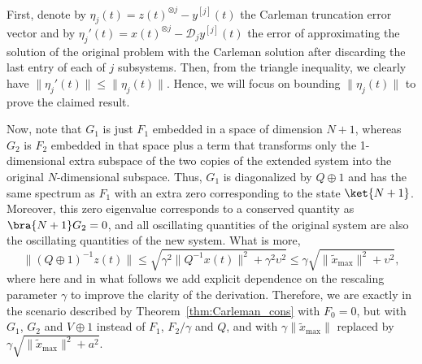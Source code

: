 \documentclass[superscriptaddress,onecolumn,nofootinbib,longbibliography,a4paper,accepted=2026-09-29]{quantumarticle}
\theoremstyle{plain}
\theoremstyle{definition}
\numberwithin{thm}{section}
\numberwithin{assumption}{section}
\numberwithin{lemma}{section}
\numberwithin{prop}{section}
\numberwithin{cor}{section}
\numberwithin{definition}{section}
\numberwithin{rmk}{section}
\numberwithin{equation}{section}
\newcommand{\ot}{\otimes}
\newcommand\D{ {\mathcal D} }
\begin{document}
First, denote by $\eta_j(t) = z(t)^{\ot j} - y^{[j]}(t)$ the Carleman truncation error vector and by $\eta_j'(t) = x(t)^{\ot j} - \D_j y^{[j]}(t) $ the error of approximating the solution of the original problem with the Carleman solution after discarding the last entry of each of $j$ subsystems. Then, from the triangle inequality, we clearly have $\|\eta_j'(t)\|\leq\|\eta_j(t)\|$. Hence, we will focus on bounding $\|\eta_j(t)\|$ to prove the claimed result.

Now, note that $G_1$ is just $F_1$ embedded in a space of dimension $N+1$, whereas $G_2$ is $F_2$ embedded in that space plus a term that transforms only the 1-dimensional extra subspace of the two copies of the extended system into the original $N$-dimensional subspace. Thus, $G_1$ is diagonalized by $Q\oplus 1$ and has the same spectrum as $F_1$ with an extra zero corresponding to the state $\ket{N+1}$. Moreover, this zero eigenvalue corresponds to a conserved quantity as $\bra{N+1}G_2=0$, and all oscillating quantities of the original system are also the oscillating quantities of the new system. What is more,
\begin{equation}
    \|(Q\oplus 1)^{-1} z(t)\| \leq \sqrt{\gamma^2\|Q^{-1} x(t)\|^2+\gamma^2 \upsilon^2} \leq \gamma \sqrt{\|\tilde{x}_{\mathrm{max}}\|^2+\upsilon^2},
\end{equation}
where here and in what follows we add explicit dependence on the rescaling parameter $\gamma$ to improve the clarity of the derivation. Therefore, we are exactly in the scenario described by Theorem~\ref{thm:Carleman_cons} with $F_0=0$, but with $G_1$, $G_2$ and $V\oplus 1$ instead of $F_1$, $F_2/\gamma$ and $Q$, and with $\gamma\|\tilde{x}_{\mathrm{max}}\|$ replaced by $\gamma\sqrt{\|\tilde{x}_{\mathrm{max}}\|^2+ a^2}$. 
\end{document}
